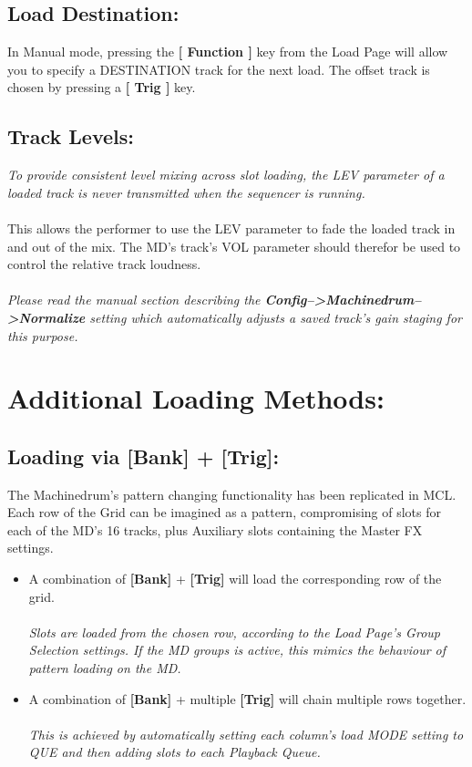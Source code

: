 \section{Load Destination:}
In Manual mode, pressing the \textbf{[ Function ]} key from the Load Page will allow you to specify a DESTINATION track for the next load. The offset track is chosen by pressing a \textbf{[ Trig ]} key.
\section{Track Levels:}
\textit{To provide consistent level mixing across slot loading, the LEV parameter of a loaded track is never transmitted when the sequencer is running.}\\\\This allows the performer to use the LEV parameter to fade the loaded track in and out of the mix. The MD's track's VOL parameter should therefor be used to control the relative track loudness.\\\\
\textit{Please read the manual section describing the \textbf{Config-->Machinedrum-->Normalize} setting which automatically adjusts a saved track's gain staging for this purpose.}

\chapter{Additional Loading Methods:}
\section{Loading via [Bank] + [Trig]:}
The Machinedrum's pattern changing functionality has been replicated in MCL. Each row of the Grid can be imagined as a pattern, compromising of slots for each of the MD's 16 tracks, plus Auxiliary slots containing the Master FX settings.

\begin{itemize}
   \item A combination of \textbf{[Bank]} + \textbf{[Trig]} will load the corresponding row of the grid.\\\\ \textit{Slots are loaded from the chosen row, according to the Load Page's Group Selection settings. If the MD groups is active, this mimics the behaviour of pattern loading on the MD.}
   \item A combination of \textbf{[Bank]} + multiple \textbf{[Trig]} will chain multiple rows together.\\\\\textit{This is achieved by automatically setting each column's load MODE setting to QUE and then adding slots to each Playback Queue.}
\end{itemize}
